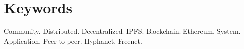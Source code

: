 \section{Keywords}

Community. Distributed. Decentralized. IPFS. Blockchain. Ethereum. System. Application. Peer-to-peer. Hyphanet. Freenet.